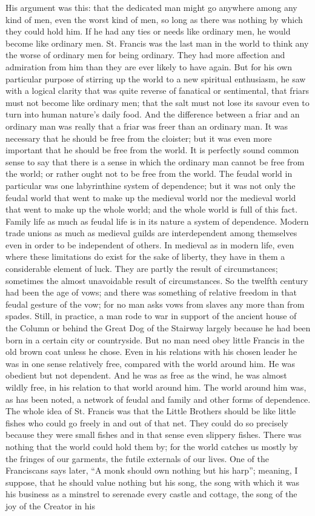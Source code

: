 \documentclass{book}
\begin{document}
His argument was this: that the dedicated man might go anywhere among any kind of men, even the worst kind of men, so long as there was nothing by which they could hold him. If he had any ties or needs like ordinary men, he would become like ordinary men. St. Francis was the last man in the world to think any the worse of ordinary men for being ordinary. They had more affection and admiration from him than they are ever likely to have again. But for his own particular purpose of stirring up the world to a new spiritual enthusiasm, he saw with a logical clarity that was quite reverse of fanatical or sentimental, that friars must not become like ordinary men; that the salt must not lose its savour even to turn into human nature’s daily food. And the difference between a friar and an ordinary man was really that a friar was freer than an ordinary man. It was necessary that he should be free from the cloister; but it was even more important that he should be free from the world. It is perfectly sound common sense to say that there is a sense in which the ordinary man cannot be free from the world; or rather ought not to be free from the world. The feudal world in particular was one labyrinthine system of dependence; but it was not only the feudal world that went to make up the medieval world nor the medieval world that went to make up the whole world; and the whole world is full of this fact. Family life as much as feudal life is in its nature a system of dependence. Modern trade unions as much as medieval guilds are interdependent among themselves even in order to be independent of others. In medieval as in modern life, even where these limitations do exist for the sake of liberty, they have in them a considerable element of luck. They are partly the result of circumstances; sometimes the almost unavoidable result of circumstances. So the twelfth century had been the age of vows; and there was something of relative freedom in that feudal gesture of the vow; for no man asks vows from slaves any more than from spades. Still, in practice, a man rode to war in support of the ancient house of the Column or behind the Great Dog of the Stairway largely because he had been born in a certain city or countryside. But no man need obey little Francis in the old brown coat unless he chose. Even in his relations with his chosen leader he was in one sense relatively free, compared with the world around him. He was obedient but not dependent. And he was as free as the wind, he was almost wildly free, in his relation to that world around him. The world around him was, as has been noted, a network of feudal and family and other forms of dependence. The whole idea of St. Francis was that the Little Brothers should be like little fishes who could go freely in and out of that net. They could do so precisely because they were small fishes and in that sense even slippery fishes. There was nothing that the world could hold them by; for the world catches us mostly by the fringes of our garments, the futile externals of our lives. One of the Franciscans says later, “A monk should own nothing but his harp”; meaning, I suppose, that he should value nothing but his song, the song with which it was his business as a minstrel to serenade every castle and cottage, the song of the joy of the Creator in his 
\end{document}
